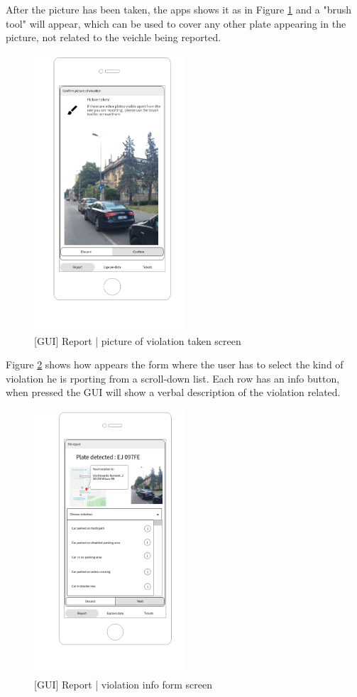 After the picture has been taken, the apps shows it as in Figure \ref{fig:pictaken} and a "brush tool" will appear, which can be used to cover any other plate appearing in the picture, not related to the veichle being reported.
\begin{figure}[H]
		\centering
      \includegraphics[width=0.5\textwidth]{GUI/picturetaken.png}
      \caption{[GUI] Report | picture of violation taken screen}   \label{fig:pictaken}
\end{figure}

Figure \ref{fig:fillform} shows how appears the form where the user has to select the kind of violation he is rporting from a scroll-down list. Each row has an info button, when pressed the GUI will show a verbal description of the violation related.
\begin{figure}[H]
		\centering
      \includegraphics[width=0.5\textwidth]{GUI/fillform.png}
      \caption{[GUI] Report | violation info form screen}   \label{fig:fillform}
\end{figure}

